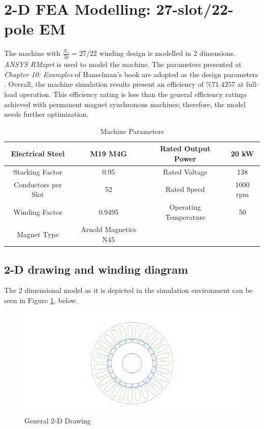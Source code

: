 \documentclass[a4paper, 11pt]{article}
\begin{document}
\section{2-D FEA Modelling: 27-slot/22-pole EM}

The machine with $\frac{N_s}{2p}=27/22$ winding design is modelled in 2 dimensions. \textit{ANSYS RMxprt} is used to model the machine. The parameters presented at \textit{Chapter 10: Examples} of Hanselman's book are adopted as the design parameters \cite{hanselman}. Overall, the machine simulation results present an efficiency of $\%71.4257$ at full-load operation. This efficiency rating is less than the general efficiency ratings achieved with permanent magnet synchronous machines; therefore, the model needs further optimization.

\begin{table}[h!]
\centering
	\begin{tabular}{|| c | c || c | c ||} 
		\hline\hline
		Electrical Steel & M19 M4G & Rated Output Power & 20 kW \\ [0.5ex] 
		\hline
		Stacking Factor & 0.95 & Rated Voltage & 138 \\ 
		\hline
		Conductors per Slot & 52 & Rated Speed & 1000 rpm \\
		\hline
		Winding Factor & 0.9495 & Operating Temperature & 50\degree \\
		Magnet Type & Arnold Magnetics N45 & \degree \\
		\hline\hline
	\end{tabular}
	\caption{Machine Parameters}
	\label{tab:Q3_machineParameters}
\end{table}



\subsection{2-D drawing and winding diagram}

The 2 dimensional model as it is depicted in the simulation environment can be seen in Figure \ref{fig:Q3_2D}, below.
\begin{figure}[h!]
    \centering
	\begin{center}
		\includegraphics[width=1.0\textwidth]{Q3_2D.png}
	\end{center}
	\caption{General 2-D Drawing}
	\label{fig:Q3_2D}
\end{figure}
\end{document}
